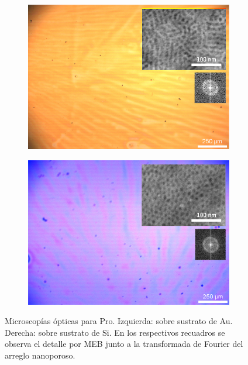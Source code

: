 			 \begin{figure}
		 	   	    \begin{subfigure}{0.495\textwidth}
			       	\includegraphics[width=\textwidth]{Imagenes/Au_130F127-Combinada.jpg}
			   		\end{subfigure}
			   		\begin{subfigure}{0.495\textwidth}
			   	    \includegraphics[width=\textwidth]{Imagenes/Si_130F127-Combinada.jpg}
			   		\end{subfigure}
					 \caption[Microscopía \pdmF\space tratamiento prolongado.]{Microscopías ópticas para Pro\pdmF. Izquierda: sobre sustrato de Au. Derecha: sobre sustrato de Si. En los respectivos recuadros se observa el detalle por MEB junto a la transformada de Fourier del arreglo nanoporoso.}
					 \label{fig:Microscopia_F127_prolongado}	
				     \end{figure}	

